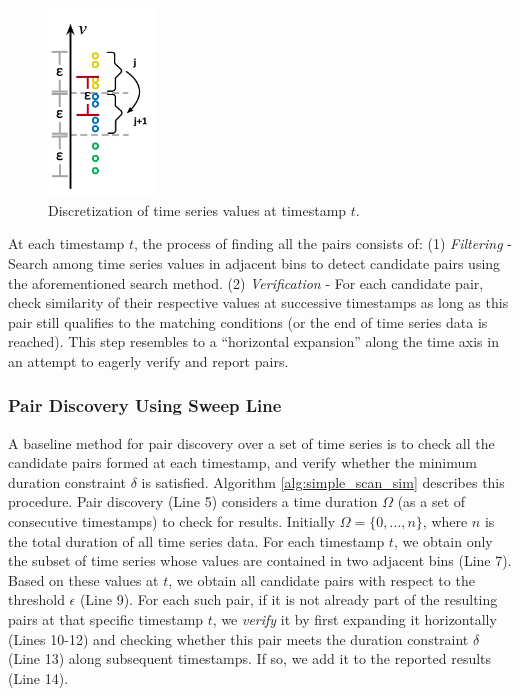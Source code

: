 \begin{figure}[tb]
    \centering
    \includegraphics[width=0.25\textwidth]{figures/index.png}
    \caption{Discretization of time series values at timestamp $t$.}
    \label{fig:index}
\end{figure}

At each timestamp $t$, the process of finding all the pairs consists of: (1) \textit{Filtering} - Search among time series values in adjacent bins to detect candidate pairs using the aforementioned search method. (2) \textit{Verification} - For each candidate pair, check similarity of their respective values at successive timestamps as long as this pair still qualifies to the matching conditions (or the end of time series data is reached). This step resembles to a ``horizontal expansion'' along the time axis in an attempt to eagerly verify and report pairs.

\subsubsection{Pair Discovery Using Sweep Line}
\label{subsec:sweep_line_join}
A baseline method for pair discovery over a set of time series is to check all the candidate pairs formed at each timestamp, and verify whether the minimum duration constraint $\delta$ is satisfied. Algorithm \ref{alg:simple_scan_sim} describes this procedure. Pair discovery (Line 5) considers a time duration $\Omega$ (as a set of consecutive timestamps) to check for results. Initially $\Omega = \{0, \dots, n\}$, where $n$ is the total duration of all time series data. For each timestamp $t$, we obtain only the subset of time series whose values are contained in two adjacent bins (Line 7). Based on these values at $t$, we obtain all candidate pairs with respect to the threshold $\epsilon$ (Line 9). For each such pair, if it is not already part of the resulting pairs at that specific timestamp $t$, we \textit{verify} it by first expanding it horizontally (Lines 10-12) and checking whether this pair meets the duration constraint $\delta$ (Line 13) along subsequent timestamps. If so, we add it to the reported results (Line 14).

